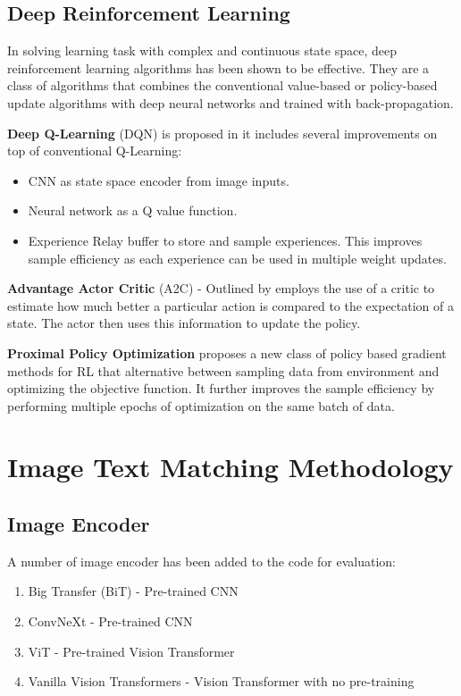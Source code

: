 \documentclass[conference]{IEEEtran}
\begin{document}
\subsection{Deep Reinforcement Learning}

In solving learning task with complex and continuous state space, deep reinforcement learning algorithms has been shown to be effective. They are a class of algorithms that combines the conventional value-based or policy-based update algorithms with deep neural networks and trained with back-propagation.

\textbf{Deep Q-Learning} (DQN) is proposed in \cite{mnihPlayingAtariDeep2013} it includes several improvements on top of conventional Q-Learning:

\begin{itemize}
    \item CNN as state space encoder from image inputs.
    \item Neural network as a Q value function.
    \item Experience Relay buffer to store and sample experiences. This improves sample efficiency as each experience can be used in multiple weight updates.
\end{itemize}

\textbf{Advantage Actor Critic} (A2C) - Outlined by \cite{plaatDeepReinforcementLearning2022} employs the use of a critic to estimate how much better a particular action is compared to the expectation of a state. The actor then uses this information to update the policy.

\textbf{Proximal Policy Optimization} \cite{schulmanProximalPolicyOptimization2017} proposes a new class of policy based gradient methods for RL that alternative between sampling data from environment and optimizing the objective function. It further improves the sample efficiency by performing multiple epochs of optimization on the same batch of data.

\section{Image Text Matching Methodology}

\subsection{Image Encoder}

A number of image encoder has been added to the code for evaluation:

\begin{enumerate}
    \item Big Transfer (BiT) - Pre-trained CNN
    \item ConvNeXt - Pre-trained CNN
    \item ViT - Pre-trained Vision Transformer
    \item Vanilla Vision Transformers - Vision Transformer with no pre-training
\end{enumerate}
\end{document}
